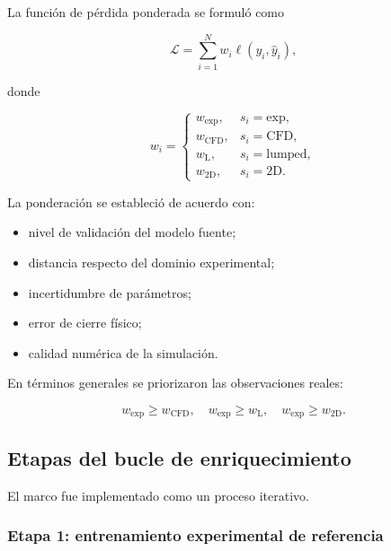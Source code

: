 La función de pérdida ponderada se formuló como

\begin{equation}
\mathcal{L}
=
\sum_{i=1}^{N}
w_i
\ell
\left(
y_i,
\hat y_i
\right),
\label{eq:loss_ponderada_hibrida}
\end{equation}

donde

\begin{equation}
w_i
=
\begin{cases}
w_{\mathrm{exp}},
&
s_i=\mathrm{exp},
\\
w_{\mathrm{CFD}},
&
s_i=\mathrm{CFD},
\\
w_{\mathrm{L}},
&
s_i=\mathrm{lumped},
\\
w_{\mathrm{2D}},
&
s_i=\mathrm{2D}.
\end{cases}
\end{equation}

La ponderación se estableció de acuerdo con:

\begin{itemize}
    \item nivel de validación del modelo fuente;
    \item distancia respecto del dominio experimental;
    \item incertidumbre de parámetros;
    \item error de cierre físico;
    \item calidad numérica de la simulación.
\end{itemize}

En términos generales se priorizaron las observaciones reales:

\begin{equation}
w_{\mathrm{exp}}
\geq
w_{\mathrm{CFD}},
\quad
w_{\mathrm{exp}}
\geq
w_{\mathrm{L}},
\quad
w_{\mathrm{exp}}
\geq
w_{\mathrm{2D}}.
\end{equation}

\subsection{Etapas del bucle de enriquecimiento}
\label{subsec:etapas_bucle_enriquecimiento}

El marco fue implementado como un proceso iterativo.

\subsubsection*{Etapa 1: entrenamiento experimental de referencia}

